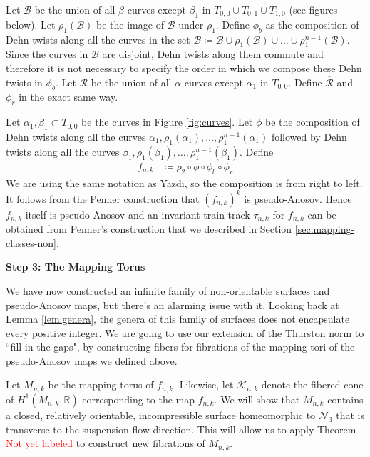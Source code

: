 Let $\mathcal{B}$ be the union of all $\beta$ curves except $\beta_1$ in $T_{0,0} \cup T_{0,1} \cup T_{1,0}$
(see figures below). Let $\rho_1(\mathcal{B})$ be the image of $\mathcal{B}$ under $\rho_1$. Define $\phi_b$
as the composition of Dehn twists along all the curves in the set
$\overline{\mathcal{B}} \coloneqq \mathcal{B} \cup \rho_1(\mathcal{B}) \cup \dots \cup
\rho_1^{n-1}(\mathcal{B})$. Since the curves in $\overline{\mathcal{B}}$ are disjoint, Dehn twists along them
commute and therefore it is not necessary to specify the order in which we compose these Dehn twists in
$\phi_b$. Let $\mathcal{R}$ be the union of all $\alpha$ curves except $\alpha_1$ in $T_{0,0}$. Define
$\overline{\mathcal{R}}$ and $\phi_r$ in the exact same way.

Let $\alpha_1,\beta_1 \subset T_{0,0}$ be the curves in Figure \ref{fig:curves}. Let $\phi$ be the composition of Dehn twists along all the curves $\alpha_1, \rho_1(\alpha_1), \dots, \rho_1^{n-1}(\alpha_1)$ followed by Dehn twists along all the curves $\beta_1,\rho_1(\beta_1),\dots,\rho_1^{n-1}(\beta_1)$. Define
\begin{align*}
    f_{n,k} &\coloneqq \rho_2 \circ \phi \circ \phi_b \circ \phi_r
\end{align*}
We are using the same notation as Yazdi, so the composition is from right to left. It follows from the Penner construction that $(f_{n,k})^k$ is pseudo-Anosov. Hence $f_{n,k}$ itself is pseudo-Anosov and an invariant train track $\tau_{n,k}$ for $f_{n,k}$ can be obtained from Penner's construction that we described in Section \ref{sec:mapping-classes-non}.

\begin{center}
\textbf{Step 3: The Mapping Torus}
\end{center}

We have now constructed an infinite family of non-orientable surfaces and pseudo-Anosov maps, but there's an alarming issue with it. Looking back at Lemma \ref{lem:genera}, the genera of this family of surfaces does not encapsulate every positive integer. We are going to use our extension of the Thurston norm to ``fill in the gaps", by constructing fibers for fibrations of the mapping tori of the pseudo-Anosov maps we defined above.

Let $M_{n,k}$ be the mapping torus of $f_{n,k}$ .Likewise, let $\mathcal{K}_{n,k}$ denote the fibered cone of $H^1(M_{n,k},\mathbb{R})$ corresponding to the map $f_{n,k}$. We will show that $M_{n,k}$ contains a closed, relatively orientable, incompressible surface homeomorphic to $\mathcal{N}_3$ that is transverse to the suspension flow direction. This will allow us to apply Theorem \textcolor{red}{Not yet labeled} to construct new fibrations of $M_{n,k}$.

